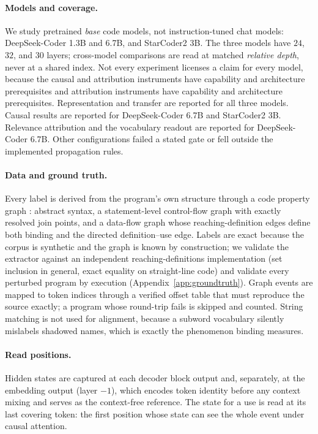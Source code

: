 \documentclass[10pt]{article}
\begin{document}
\paragraph{Models and coverage.} We study pretrained \emph{base} code models,
not instruction-tuned chat models: DeepSeek-Coder 1.3B and 6.7B, and StarCoder2
3B. The three models have $24$, $32$, and $30$ layers; cross-model comparisons
are read at matched \emph{relative depth}, never at a shared index. Not every
experiment licenses a claim for every model, because the causal and attribution
instruments have capability and architecture prerequisites
and attribution instruments have capability and architecture prerequisites.
Representation and transfer are reported for all three models. Causal results are
reported for DeepSeek-Coder 6.7B and StarCoder2 3B. Relevance attribution and the
vocabulary readout are reported for DeepSeek-Coder 6.7B. Other configurations
failed a stated gate or fell outside the implemented propagation rules.

\paragraph{Data and ground truth.} Every label is derived from the program's own
structure through a code property graph \citep{yamaguchi2014cpg}: abstract
syntax, a statement-level control-flow graph with exactly resolved join points,
and a data-flow graph whose reaching-definition edges define both binding and the
directed definition--use edge. Labels are exact because the corpus is synthetic
and the graph is known by construction; we validate the extractor against an
independent reaching-definitions implementation (set inclusion in general, exact
equality on straight-line code) and validate every perturbed program by execution
(Appendix~\ref{app:groundtruth}). Graph events are mapped to token indices through
a verified offset table that must reproduce the source exactly; a program whose
round-trip fails is skipped and counted. String matching is not used for
alignment, because a subword vocabulary silently mislabels shadowed names, which
is exactly the phenomenon binding measures.

\paragraph{Read positions.} Hidden states are captured at each decoder block
output and, separately, at the embedding output (layer $-1$), which encodes token
identity before any context mixing and serves as the context-free reference. The
state for a use is read at its last covering token: the first position whose
state can see the whole event under causal attention.
\end{document}
